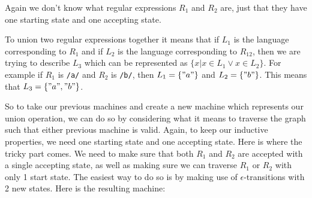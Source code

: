 \documentclass[main.tex]{subfiles}
\begin{document}
Again we don't know what regular expressions $R_1$ and $R_2$ are, just that they have one starting state and one accepting state. 

To union two regular expressions together it means that if $L_1$ is the language corresponding to $R_1$ and if $L_2$ is the language corresponding to $R_12$, then we are trying to describe $L_3$ which can be represented as $\{x\vert x \in L_1 \lor x \in L_2\}$. For example if $R_1$ is \texttt{/a/} and $R_2$ is \texttt{/b/}, then $L_1 =\{"a"\}$ and $L_2 = \{"b"\}$. This means that $L_3 = \{"a","b"\}$. 

So to take our previous machines and create a new machine which represents our union operation, we can do so by considering what it means to traverse the graph such that either previous machine is valid. Again, to keep our inductive properties, we need one starting state and one accepting state. Here is where the tricky part comes. We need to make sure that both $R_1$ and $R_2$ are accepted with a single accepting state, as well as making sure we can traverse $R_1$ or $R_2$ with only 1 start state. The easiest way to do so is by making use of $\epsilon$-transitions with 2 new states. Here is the resulting machine:
\begin{center}
\end{center}
\end{document}
